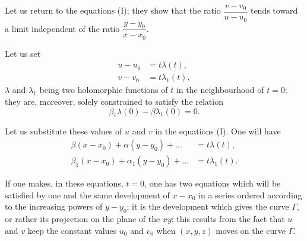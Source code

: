 \documentclass{article}
\begin{document}
Let us return to the equations (I); they show that the ratio $\dfrac{v - v_{0}}{u - u_{0}}$ tends toward a limit independent of the ratio $\dfrac{y - y_{0}}{x - x_{0}}$.

Let us set
\[
\begin{aligned}
u - u_{0} &= t\lambda(t), \\
v - v_{0} &= t\lambda_{1}(t),
\end{aligned}
\]
$\lambda$ and $\lambda_{1}$ being two holomorphic functions of $t$ in the neighbourhood of $t = 0$; they are, moreover, solely constrained to satisfy the relation
\[
\beta_{1}\lambda(0) - \beta\lambda_{1}(0) = 0.
\]

Let us substitute these values of $u$ and $v$ in the equations (I). One will have
\[
\begin{aligned}
\beta(x - x_{0}) + \alpha(y - y_{0}) + \ldots &= t\lambda(t), \\
\beta_{1}(x - x_{0}) + \alpha_{1}(y - y_{0}) + \ldots &= t\lambda_{1}(t).
\end{aligned}
\tag{II}
\]

If one makes, in these equations, $t = 0$, one has two equations which will be satisfied by one and the same development of $x - x_{0}$ in a series ordered according to the increasing powers of $y - y_{0}$; it is the development which gives the curve $\Gamma$, or rather its projection on the plane of the $xy$; this results from the fact that $u$ and $v$ keep the constant values $u_{0}$ and $v_{0}$ when $(x, y, z)$ moves on the curve $\Gamma$.
\end{document}
